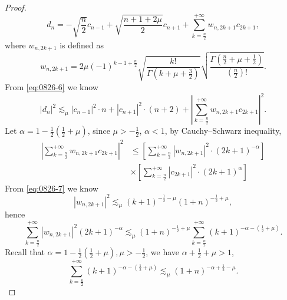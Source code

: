\documentclass[pdflatex,sn-aps]{sn-jnl}%
\theoremstyle{thmstyleone}%
\theoremstyle{thmstyletwo}%
\theoremstyle{thmstylethree}%
\begin{document}
\begin{appendices}
\begin{proof}
  \begin{equation}\label{eq:0826-6}
    d_n=-\sqrt{\frac{n}{2}} c_{n-1}+\sqrt{\frac{n+1+2 \mu}{2}} c_{n+1}+\sum_{k=\frac{n}{2}}^{+\infty} w_{n, 2 k+1} c_{2 k+1},
  \end{equation}
  where $w_{n, 2k+1}$ is defined as
  \begin{equation}\label{eq:0826-7}
    w_{n, 2 k+1}=2 \mu(-1)^{k-1+\frac{n}{2}} \sqrt{\frac{k!}{\Gamma\left(k+\mu+\frac{3}{2}\right)}} \sqrt{\frac{\Gamma\left(\frac{n}{2}+\mu+\frac{1}{2}\right)}{\left(\frac{n}{2}\right)!}}.
  \end{equation}
  From \eqref{eq:0826-6} we know
  \begin{equation}\label{eq:0826-8}
    \left|d_n\right|^2 \lesssim_\mu \left|c_{n-1}\right|^2 \cdot n+\left|c_{n+1}\right|^2 \cdot(n+2)+\left|\sum_{k=\frac{n}{2}}^{+\infty} w_{n, 2 k+1} c_{2 k+1}\right|^2.
  \end{equation}
  Let $\alpha = 1 - \frac{1}{2}\left(\frac{1}{2}+\mu\right)$, since $\mu > -\frac{1}{2}$,
  $\alpha < 1$, by Cauchy--Schwarz inequality,
  \begin{equation}\label{eq:0826-9}
    \begin{aligned}
    \left|\sum_{k=\frac{n}{2}}^{+\infty} w_{n, 2 k+1} c_{2 k+1}\right|^2 &\leqslant {\left[\sum_{k=\frac{n}{2}}^{+\infty}\left|w_{n, 2 k+1}\right|^2 \cdot(2 k+1)^{-\alpha}\right]} \\
    &\times {\left[\sum_{k=\frac{n}{2}}^{+\infty}\left|c_{2 k+1}\right|^2 \cdot(2 k+1)^\alpha\right] }
    \end{aligned}
  \end{equation}
  From \eqref{eq:0826-7} we know
  \begin{equation}\label{eq:0826-10}
    \left|w_{n, 2 k+1}\right|^2 \lesssim_\mu(k+1)^{-\frac{1}{2}-\mu}(1+n)^{-\frac{1}{2}+\mu},
  \end{equation}
  hence
  \begin{equation}\label{eq:0826-11}
    \sum_{k=\frac{n}{2}}^{+\infty}\left|w_{n, 2 k+1}\right|^2(2 k+1)^{-\alpha} \lesssim_\mu(1+n)^{-\frac{1}{2}+\mu} \sum_{k=\frac{n}{2}}^{+\infty}(k+1)^{-\alpha-\left(\frac{1}{2}+\mu\right)}.
  \end{equation}
  Recall that $\alpha=1-\frac{1}{2}\left(\frac{1}{2}+\mu\right), \mu>-\frac{1}{2}$, we have
  $\alpha+\frac{1}{2}+\mu > 1$,
  \begin{equation}\label{eq:0826-12}
    \sum_{k=\frac{n}{2}}^{+\infty}(k+1)^{-\alpha-\left(\frac{1}{2}+\mu\right)} \lesssim_\mu(1+n)^{-\alpha+\frac{1}{2}-\mu}.
  \end{equation}

\end{proof}
\end{appendices}
\end{document}
